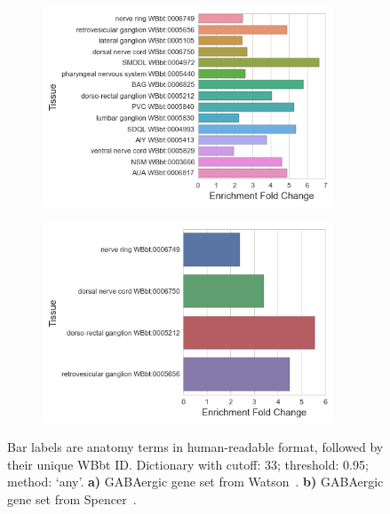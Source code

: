 \documentclass{bmcart}
\begin{document}
\begin{backmatter}
\begin{figure}
  \begin{subfigure}[b]{0.95\textwidth}
    \includegraphics[width=0.95\textwidth]{WBPaper00024970_GABAergic_neuron_specific_WBbt_0005190_247_33cutoff.png}
    \caption{}
    \label{fig:agreement1}
  \end{subfigure}
  \begin{subfigure}[b]{0.95\textwidth} 	\includegraphics[width=0.95\textwidth]{WBPaper00037950_GABAergic-motor-neurons_larva_enriched_WBbt_0005190_132_33cutoff.png}
    \caption{}
    \label{fig:agreement2}
  \end{subfigure}
  \captionsetup{width= 0.95\textwidth}
  \caption{
  Bar labels are anatomy terms in human-readable format, followed by their unique WBbt ID. Dictionary with cutoff: 33; threshold: 0.95; method: `any'.
  \textbf{a)} GABAergic gene set from Watson~\cite{Watson2008a}.
  \textbf{b)} GABAergic gene set from Spencer~\cite{Spencer2011}.
   }
   \label{fig:intragree}
\end{figure}



\end{backmatter}
\end{document}

